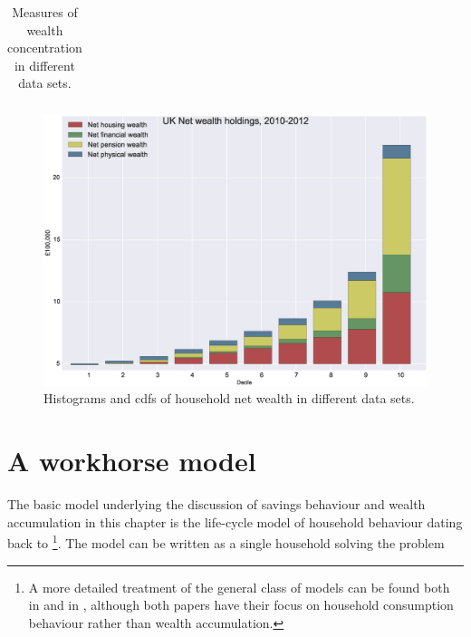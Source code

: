 \begin{table}%
\begin{tabular}{lcr}

\end{tabular}
\caption{Measures of wealth concentration in different data sets.}
\label{tab:gini_topshares}
\end{table}

\begin{figure}
\includegraphics[width=\columnwidth]{was_wealth_holdings}
\caption{Histograms and cdfs of household net wealth in different data sets.}
\label{fig:was_wealthholdings}
\end{figure}

\section{A workhorse model}
The basic model underlying the discussion of savings behaviour and wealth 
accumulation in this chapter is the life-cycle model of household behaviour 
dating back to \citet{ModiglianiBrumberg1954} \footnote{A more detailed 
treatment of the general class of models can be found both in 
\citet{BrowningCrossley2001} and in \citet{AttanasioWeber2010}, although both 
papers have their focus on household consumption behaviour rather than wealth 
accumulation.}. The model can be written as a single household solving the 
problem


